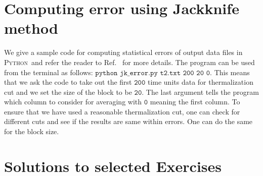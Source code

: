 \documentclass[letter,11pt]{article}
\newcommand{\PY}{\textsc{Python}}
\begin{document}
\section{\label{sec:jk_code}Computing error using Jackknife method}
We give a sample code for computing statistical errors of output data files in \PY~and refer the reader to Ref.~\cite{2012arXiv1210.3781Y} for more details. The program can be used from the terminal as follows: 
$\texttt{python jk\_error.py t2.txt 200 20 0}$. 
This means that we ask the code to take out the first $\texttt{200}$ time units data for thermalization cut and we set the size of the block to be $\texttt{20}$. The last argument tells the program which column to consider for averaging with $\texttt{0}$ meaning the first column. To ensure that we have used a reasonable thermalization cut, one can check for different cuts and see if the results 
are same within errors. One can do the same for the block size. 
	\begin{mdframed}[backgroundcolor=mauve!3] 
			
	\end{mdframed} 

\section{\label{sec:solutions}Solutions to selected Exercises} 
\end{document}
